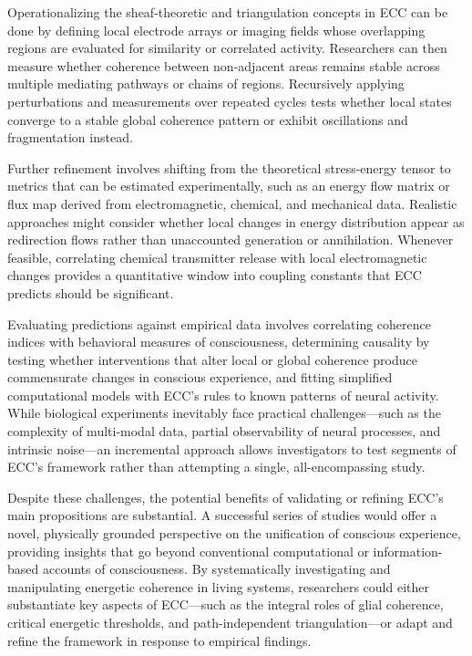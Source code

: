 \begin{refsection}
Operationalizing the sheaf-theoretic and triangulation concepts in ECC can be done by defining local electrode arrays or imaging fields whose overlapping regions are evaluated for similarity or correlated activity. Researchers can then measure whether coherence between non-adjacent areas remains stable across multiple mediating pathways or chains of regions. Recursively applying perturbations and measurements over repeated cycles tests whether local states converge to a stable global coherence pattern or exhibit oscillations and fragmentation instead.

Further refinement involves shifting from the theoretical stress-energy tensor to metrics that can be estimated experimentally, such as an energy flow matrix or flux map derived from electromagnetic, chemical, and mechanical data. Realistic approaches might consider whether local changes in energy distribution appear as redirection flows rather than unaccounted generation or annihilation. Whenever feasible, correlating chemical transmitter release with local electromagnetic changes provides a quantitative window into coupling constants that ECC predicts should be significant.

Evaluating predictions against empirical data involves correlating coherence indices with behavioral measures of consciousness, determining causality by testing whether interventions that alter local or global coherence produce commensurate changes in conscious experience, and fitting simplified computational models with ECC’s rules to known patterns of neural activity. While biological experiments inevitably face practical challenges—such as the complexity of multi-modal data, partial observability of neural processes, and intrinsic noise—an incremental approach allows investigators to test segments of ECC’s framework rather than attempting a single, all-encompassing study.

Despite these challenges, the potential benefits of validating or refining ECC’s main propositions are substantial. A successful series of studies would offer a novel, physically grounded perspective on the unification of conscious experience, providing insights that go beyond conventional computational or information-based accounts of consciousness. By systematically investigating and manipulating energetic coherence in living systems, researchers could either substantiate key aspects of ECC—such as the integral roles of glial coherence, critical energetic thresholds, and path-independent triangulation—or adapt and refine the framework in response to empirical findings.


\end{refsection}
